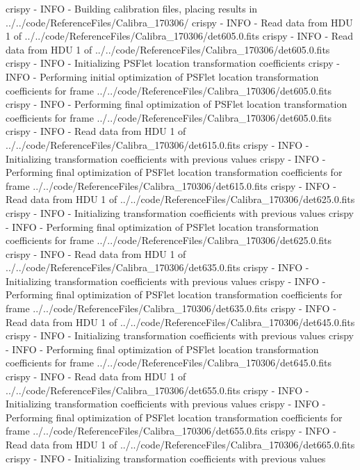 \documentclass[letterpaper,10pt,english]{sphinxmanual}
\begin{document}
\begin{OriginalVerbatim}[commandchars=\\\{\}]
crispy - INFO - Building calibration files, placing results in ../../code/ReferenceFiles/Calibra_170306/
crispy - INFO - Read data from HDU 1 of ../../code/ReferenceFiles/Calibra_170306/det605.0.fits
crispy - INFO - Read data from HDU 1 of ../../code/ReferenceFiles/Calibra_170306/det605.0.fits
crispy - INFO - Initializing PSFlet location transformation coefficients
crispy - INFO - Performing initial optimization of PSFlet location transformation coefficients for frame ../../code/ReferenceFiles/Calibra_170306/det605.0.fits
crispy - INFO - Performing final optimization of PSFlet location transformation coefficients for frame ../../code/ReferenceFiles/Calibra_170306/det605.0.fits
crispy - INFO - Read data from HDU 1 of ../../code/ReferenceFiles/Calibra_170306/det615.0.fits
crispy - INFO - Initializing transformation coefficients with previous values
crispy - INFO - Performing final optimization of PSFlet location transformation coefficients for frame ../../code/ReferenceFiles/Calibra_170306/det615.0.fits
crispy - INFO - Read data from HDU 1 of ../../code/ReferenceFiles/Calibra_170306/det625.0.fits
crispy - INFO - Initializing transformation coefficients with previous values
crispy - INFO - Performing final optimization of PSFlet location transformation coefficients for frame ../../code/ReferenceFiles/Calibra_170306/det625.0.fits
crispy - INFO - Read data from HDU 1 of ../../code/ReferenceFiles/Calibra_170306/det635.0.fits
crispy - INFO - Initializing transformation coefficients with previous values
crispy - INFO - Performing final optimization of PSFlet location transformation coefficients for frame ../../code/ReferenceFiles/Calibra_170306/det635.0.fits
crispy - INFO - Read data from HDU 1 of ../../code/ReferenceFiles/Calibra_170306/det645.0.fits
crispy - INFO - Initializing transformation coefficients with previous values
crispy - INFO - Performing final optimization of PSFlet location transformation coefficients for frame ../../code/ReferenceFiles/Calibra_170306/det645.0.fits
crispy - INFO - Read data from HDU 1 of ../../code/ReferenceFiles/Calibra_170306/det655.0.fits
crispy - INFO - Initializing transformation coefficients with previous values
crispy - INFO - Performing final optimization of PSFlet location transformation coefficients for frame ../../code/ReferenceFiles/Calibra_170306/det655.0.fits
crispy - INFO - Read data from HDU 1 of ../../code/ReferenceFiles/Calibra_170306/det665.0.fits
crispy - INFO - Initializing transformation coefficients with previous values

\end{OriginalVerbatim}
\end{document}
